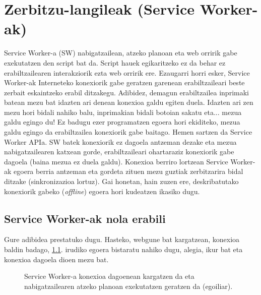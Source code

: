 \chapter{Zerbitzu-langileak (Service Worker-ak)}
Service Worker-a (SW) nabigatzailean, atzeko planoan eta web orririk gabe exekutatzen den \mbox{script} bat da. Script hauek egikaritzeko ez da behar ez erabiltzailearen interakziorik ezta web orririk ere. Ezaugarri horri esker, Service Worker-ak Interneteko konexiorik gabe geratzen garenean erabiltzaileari beste zerbait eskaintzeko erabil ditzakegu. Adibidez, demagun erabiltzailea inprimaki batean mezu bat idazten ari denean konexioa galdu egiten duela. Idazten ari zen mezu hori bidali nahiko balu, inprimakian bidali botoian sakatu eta... mezua galdu egingo du! Ez badugu ezer programatzen egoera hori ekiditeko, mezua galdu egingo da erabiltzailea konexiorik gabe baitago. Hemen sartzen da Service Worker APIa. SW batek konexiorik ez dagoela antzeman dezake eta mezua nabigatzailearen katxean gorde, erabiltzaileari ohartaraziz konexiorik gabe dagoela (baina mezua ez duela galdu). Konexioa berriro lortzean Service Worker-ak egoera berria antzeman eta gordeta zituen mezu guztiak zerbitzarira bidal ditzake (sinkronizazioa lortuz). Gai honetan, hain zuzen ere, deskribatutako konexiorik gabeko (\textit{offline}) egoera hori kudeatzen ikasiko dugu.

\section{Service Worker-ak nola erabili}

Gure adibidea prestatuko dugu. Hasteko, webgune bat kargatzean, konexioa baldin badago, \ref{fig:serviceworker1}. irudiko egoera bistaratu nahiko dugu, alegia, ikur bat eta konexioa dagoela dioen mezu bat.
\begin{figure}[ht]
	\centering
{}
\caption{Service Worker-a konexioa dagoenean kargatzen da eta nabigatzailearen atzeko planoan exekutatzen geratzen da (egoiliar).}
\label{fig:serviceworker1}
\end{figure}

